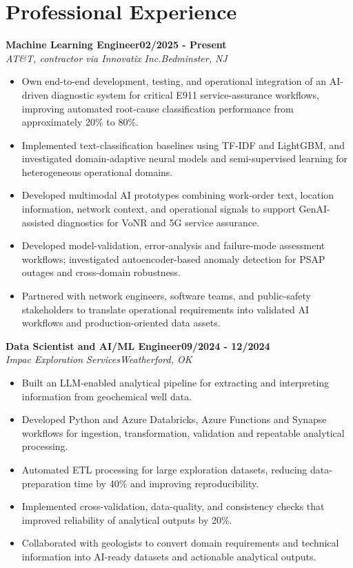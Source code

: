 \documentclass[9pt,letterpaper]{extarticle}
\newcommand{\role}[4]{%
  \Needspace{4\baselineskip}\textbf{#1}\hfill\textbf{#2}\\[-1pt]
  \textit{#3}\hfill\textit{#4}\par}
\begin{document}
\section{Professional Experience}
\role{Machine Learning Engineer}{02/2025 - Present}{AT\&T, contractor via Innovatix Inc.}{Bedminster, NJ}
\begin{itemize}
\item Own end-to-end development, testing, and operational integration of an AI-driven diagnostic system for critical E911 service-assurance workflows, improving automated root-cause classification performance from approximately 20\% to 80\%.
\item Implemented text-classification baselines using TF-IDF and LightGBM, and investigated domain-adaptive neural models and semi-supervised learning for heterogeneous operational domains.
\item Developed multimodal AI prototypes combining work-order text, location information, network context, and operational signals to support GenAI-assisted diagnostics for VoNR and 5G service assurance.
\item Developed model-validation, error-analysis and failure-mode assessment workflows; investigated autoencoder-based anomaly detection for PSAP outages and cross-domain robustness.
\item Partnered with network engineers, software teams, and public-safety stakeholders to translate operational requirements into validated AI workflows and production-oriented data assets.
\end{itemize}
\role{Data Scientist and AI/ML Engineer}{09/2024 - 12/2024}{Impac Exploration Services}{Weatherford, OK}
\begin{itemize}
\item Built an LLM-enabled analytical pipeline for extracting and interpreting information from geochemical well data.
\item Developed Python and Azure Databricks, Azure Functions and Synapse workflows for ingestion, transformation, validation and repeatable analytical processing.
\item Automated ETL processing for large exploration datasets, reducing data-preparation time by 40\% and improving reproducibility.
\item Implemented cross-validation, data-quality, and consistency checks that improved reliability of analytical outputs by 20\%.
\item Collaborated with geologists to convert domain requirements and technical information into AI-ready datasets and actionable analytical outputs.
\end{itemize}
\end{document}
